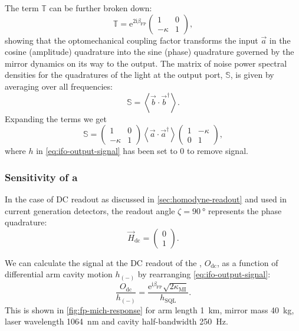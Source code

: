 The term $\mathbb{T}$ can be further broken down:
\begin{equation}
  \mathbb{T} = \text{e}^{2 \text{i} \beta_{\text{FP}}}
  \begin{pmatrix}
    1 & 0 \\
    -\kappa & 1
  \end{pmatrix},
\end{equation}
showing that the optomechanical coupling factor transforms the input $\vec{a}$ in the cosine (amplitude) quadrature into the sine (phase) quadrature governed by the mirror dynamics on its way to the output. The matrix of noise power spectral densities for the quadratures of the light at the output port, $\mathbb{S}$, is given by averaging over all frequencies:
\begin{equation}
  \mathbb{S} = \left< \vec{b} \cdot \vec{b}^{\dag} \right>.
\end{equation}
Expanding the terms we get
\begin{equation}
  \mathbb{S} =
  \begin{pmatrix}
    1 & 0 \\
    -\kappa & 1
  \end{pmatrix}
  \left< \vec{a} \cdot \vec{a}^{\dag} \right>
  \begin{pmatrix}
    1 & -\kappa \\
    0 & 1
  \end{pmatrix},
\end{equation}
where $h$ in \cref{eq:ifo-output-signal} has been set to \num{0} to remove signal.

\subsubsection{Sensitivity of a \FPMI{}}
In the case of \gls{DC} readout as discussed in \cref{sec:homodyne-readout} and used in current generation detectors, the readout angle $\zeta = \SI{90}{\degree}$ represents the phase quadrature:
\begin{equation}
  \vec{H}_{\text{dc}} =
  \begin{pmatrix}
    0 \\
    1
  \end{pmatrix}.
\end{equation}

We can calculate the signal at the \gls{DC} readout of the \FPMI{}, $O_{\text{dc}}$, as a function of differential arm cavity motion $h_{\left( - \right)}$ by rearranging \cref{eq:ifo-output-signal}:
\begin{equation}
  \frac{O_{\text{dc}}}{h_{\left( - \right)}} = \frac{\text{e}^{\text{i} \beta_{\text{FP}}} \sqrt{2 \kappa_{\text{MI}}}}{h_{\text{SQL}}}.
\end{equation}
This is shown in \cref{fig:fp-mich-response} for arm length \SI{1}{\kilo\meter}, mirror mass \SI{40}{\kilo\gram}, laser wavelength \SI{1064}{\nano\meter} and cavity half-bandwidth \SI{250}{\hertz}.

